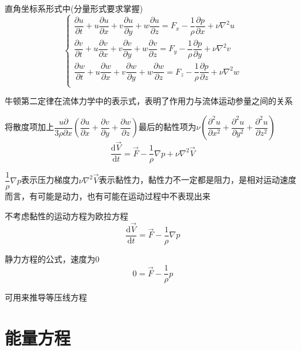 \documentclass[a4paper,oneside]{ctexbook}
\begin{document}
直角坐标系形式中(分量形式要求掌握)
\begin{equation}
\left\{
\begin{array}{c}
    \dfrac{\partial{u}}{\partial{t}}+u\dfrac{\partial{u}}{\partial{x}}+v\dfrac{\partial{u}}{\partial{y}}+w\dfrac{\partial{u}}{\partial{z}}=F_x-\dfrac{1}{\rho}\dfrac{\partial{p}}{\partial{x}}+\nu\nabla^2u\\
    \dfrac{\partial{v}}{\partial{t}}+u\dfrac{\partial{v}}{\partial{x}}+v\dfrac{\partial{v}}{\partial{y}}+w\dfrac{\partial{v}}{\partial{z}}=F_y-\dfrac{1}{\rho}\dfrac{\partial{p}}{\partial{y}}+\nu\nabla^2v\\
    \dfrac{\partial{w}}{\partial{t}}+u\dfrac{\partial{w}}{\partial{x}}+v\dfrac{\partial{w}}{\partial{y}}+w\dfrac{\partial{w}}{\partial{z}}=F_z-\dfrac{1}{\rho}\dfrac{\partial{p}}{\partial{z}}+\nu\nabla^2w\\
\end{array}
\right.
\end{equation}

牛顿第二定律在流体力学中的表示式，表明了作用力与流体运动参量之间的关系

将散度项加上\(\dfrac{u\partial}{3\rho\partial{x}}(\dfrac{\partial{u}}{\partial{x}}+\dfrac{\partial{v}}{\partial{y}}+\dfrac{\partial{w}}{\partial{z}})\)最后的黏性项为\(\nu(\dfrac{\partial^2u}{\partial{x^2}}+\dfrac{\partial^2u}{\partial{y^2}}+\dfrac{\partial^2u}{\partial{z^2}})\)
\begin{equation}
    \dfrac{\mathrm{d}\overrightarrow{V}}{\mathrm{d}t}=\overrightarrow{F}-\dfrac{1}{\rho}\nabla{p}+\nu\nabla^2\overrightarrow{V}
\end{equation}

\(\dfrac{1}{\rho}\nabla{p}\)表示压力梯度力\(\nu\nabla^2\overrightarrow{V}\)表示黏性力，黏性力不一定都是阻力，是相对运动速度而言，有可能是动力，也有可能在运动过程中不表现出来

不考虑黏性的运动方程为欧拉方程
\begin{equation}
    \dfrac{\mathrm{d}\overrightarrow{V}}{\mathrm{d}t}=\overrightarrow{F}-\dfrac{1}{\rho}\nabla{p}
\end{equation}

静力方程的公式，速度为0
\begin{equation}
    0=\overrightarrow{F}-\dfrac{1}{\rho}p
\end{equation}

可用来推导等压线方程

\section{能量方程}%
\end{document}
